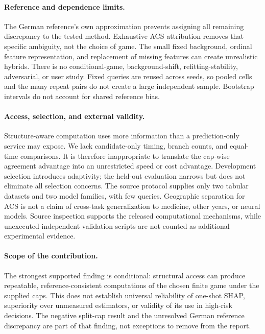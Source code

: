 \documentclass{article}
\begin{document}
\paragraph{Reference and dependence limits.}
The German reference's own approximation prevents assigning all remaining discrepancy to the tested method. Exhaustive ACS attribution removes that specific ambiguity, not the choice of game. The small fixed background, ordinal feature representation, and replacement of missing features can create unrealistic hybrids. There is no conditional-game, background-shift, refitting-stability, adversarial, or user study. Fixed queries are reused across seeds, so pooled cells and the many repeat pairs do not create a large independent sample. Bootstrap intervals do not account for shared reference bias.

\paragraph{Access, selection, and external validity.}
Structure-aware computation uses more information than a prediction-only service may expose. We lack candidate-only timing, branch counts, and equal-time comparisons. It is therefore inappropriate to translate the cap-wise agreement advantage into an unrestricted speed or cost advantage. Development selection introduces adaptivity; the held-out evaluation narrows but does not eliminate all selection concerns. The source protocol supplies only two tabular datasets and two model families, with few queries. Geographic separation for ACS is not a claim of cross-task generalization to medicine, other years, or neural models. Source inspection supports the released computational mechanisms, while unexecuted independent validation scripts are not counted as additional experimental evidence.

\paragraph{Scope of the contribution.}
The strongest supported finding is conditional: structural access can produce repeatable, reference-consistent computations of the chosen finite game under the supplied caps. This does not establish universal reliability of one-shot SHAP, superiority over unmeasured estimators, or validity of its use in high-risk decisions. The negative split-cap result and the unresolved German reference discrepancy are part of that finding, not exceptions to remove from the report.
\end{document}
